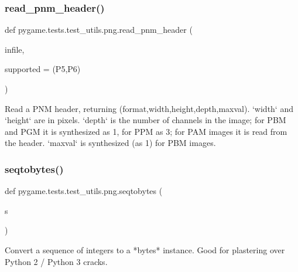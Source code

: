 \subsubsection{\texorpdfstring{read\+\_\+pnm\+\_\+header()}{read\_pnm\_header()}}
{\footnotesize\ttfamily def pygame.\+tests.\+test\+\_\+utils.\+png.\+read\+\_\+pnm\+\_\+header (\begin{DoxyParamCaption}\item[{}]{infile,  }\item[{}]{supported = {\ttfamily (\textquotesingle{}P5\textquotesingle{},\textquotesingle{}P6\textquotesingle{})} }\end{DoxyParamCaption})}

\begin{DoxyVerb}Read a PNM header, returning (format,width,height,depth,maxval).
`width` and `height` are in pixels.  `depth` is the number of
channels in the image; for PBM and PGM it is synthesized as 1, for
PPM as 3; for PAM images it is read from the header.  `maxval` is
synthesized (as 1) for PBM images.
\end{DoxyVerb}
 \mbox{\label{namespacepygame_1_1tests_1_1test__utils_1_1png_a542cdd0a03ad991fdf4b00857e994276}} 
\subsubsection{\texorpdfstring{seqtobytes()}{seqtobytes()}}
{\footnotesize\ttfamily def pygame.\+tests.\+test\+\_\+utils.\+png.\+seqtobytes (\begin{DoxyParamCaption}\item[{}]{s }\end{DoxyParamCaption})}

\begin{DoxyVerb}Convert a sequence of integers to a *bytes* instance.  Good for
plastering over Python 2 / Python 3 cracks.
\end{DoxyVerb}
 \mbox{\label{namespacepygame_1_1tests_1_1test__utils_1_1png_abee6308b578c5ccc25a67f44c3eb3e2c}} 
